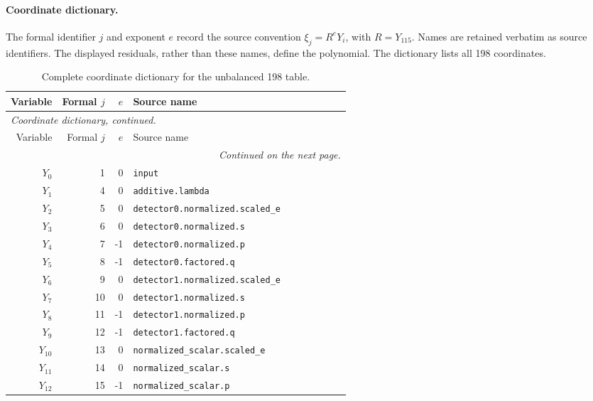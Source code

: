 \paragraph{Coordinate dictionary.}
The formal identifier $j$ and exponent $e$ record the source convention
$\xi_j=R^eY_i$, with $R=Y_{115}$.  Names are retained verbatim as source
identifiers.  The displayed residuals, rather than these names, define
the polynomial.  The dictionary lists all 198 coordinates.
{\small
\setlength{\tabcolsep}{4pt}
\begin{longtable}{@{}r r r p{0.64\linewidth}@{}}
\caption{Complete coordinate dictionary for the unbalanced 198 table.}
\label{q198:coordinates}\\
\hline
Variable & Formal $j$ & $e$ & Source name \\
\hline
\endfirsthead
\multicolumn{4}{l}{\emph{Coordinate dictionary, continued.}}\\
\hline
Variable & Formal $j$ & $e$ & Source name \\
\hline
\endhead
\hline\multicolumn{4}{r}{\emph{Continued on the next page.}}\\
\endfoot
\hline
\endlastfoot
\(Y_{0}\) & 1 & 0 & \texttt{input} \\
\(Y_{1}\) & 4 & 0 & \texttt{additive.\allowbreak{}lambda} \\
\(Y_{2}\) & 5 & 0 & \texttt{detector0.\allowbreak{}normalized.\allowbreak{}scaled\_e} \\
\(Y_{3}\) & 6 & 0 & \texttt{detector0.\allowbreak{}normalized.\allowbreak{}s} \\
\(Y_{4}\) & 7 & -1 & \texttt{detector0.\allowbreak{}normalized.\allowbreak{}p} \\
\(Y_{5}\) & 8 & -1 & \texttt{detector0.\allowbreak{}factored.\allowbreak{}q} \\
\(Y_{6}\) & 9 & 0 & \texttt{detector1.\allowbreak{}normalized.\allowbreak{}scaled\_e} \\
\(Y_{7}\) & 10 & 0 & \texttt{detector1.\allowbreak{}normalized.\allowbreak{}s} \\
\(Y_{8}\) & 11 & -1 & \texttt{detector1.\allowbreak{}normalized.\allowbreak{}p} \\
\(Y_{9}\) & 12 & -1 & \texttt{detector1.\allowbreak{}factored.\allowbreak{}q} \\
\(Y_{10}\) & 13 & 0 & \texttt{normalized\_scalar.\allowbreak{}scaled\_e} \\
\(Y_{11}\) & 14 & 0 & \texttt{normalized\_scalar.\allowbreak{}s} \\
\(Y_{12}\) & 15 & -1 & \texttt{normalized\_scalar.\allowbreak{}p} \\

\end{longtable}}
